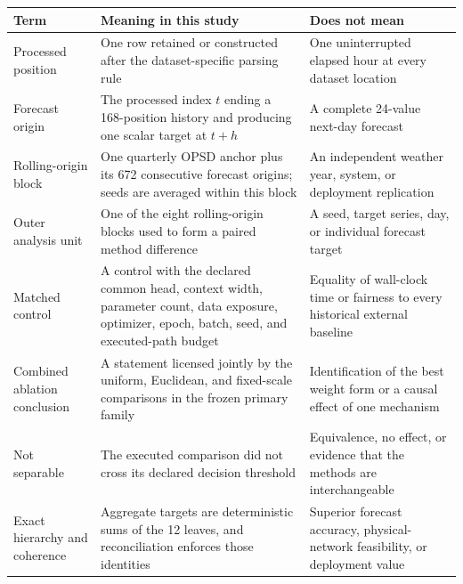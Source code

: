 \documentclass[electronics,article,submit,moreauthors]{Definitions/mdpi}
\begin{document}
\begin{longtable}[]{@{}
  >{\raggedright\arraybackslash}p{}
  >{\raggedright\arraybackslash}p{}
  >{\raggedright\arraybackslash}p{}@{}}
\toprule\noalign{}
\begin{minipage}[b]{\linewidth}\raggedright
Term
\end{minipage} & \begin{minipage}[b]{\linewidth}\raggedright
Meaning in this study
\end{minipage} & \begin{minipage}[b]{\linewidth}\raggedright
Does not mean
\end{minipage} \\
\midrule\noalign{}
\endhead
\bottomrule\noalign{}
\endlastfoot
Processed position & One row retained or constructed after the dataset-specific parsing rule & One uninterrupted elapsed hour at every dataset location \\
Forecast origin & The processed index \(t\) ending a 168-position history and producing one scalar target at \(t+h\) & A complete 24-value next-day forecast \\
Rolling-origin block & One quarterly OPSD anchor plus its 672 consecutive forecast origins; seeds are averaged within this block & An independent weather year, system, or deployment replication \\
Outer analysis unit & One of the eight rolling-origin blocks used to form a paired method difference & A seed, target series, day, or individual forecast target \\
Matched control & A control with the declared common head, context width, parameter count, data exposure, optimizer, epoch, batch, seed, and executed-path budget & Equality of wall-clock time or fairness to every historical external baseline \\
Combined ablation conclusion & A statement licensed jointly by the uniform, Euclidean, and fixed-scale comparisons in the frozen primary family & Identification of the best weight form or a causal effect of one mechanism \\
Not separable & The executed comparison did not cross its declared decision threshold & Equivalence, no effect, or evidence that the methods are interchangeable \\
Exact hierarchy and coherence & Aggregate targets are deterministic sums of the 12 leaves, and reconciliation enforces those identities & Superior forecast accuracy, physical-network feasibility, or deployment value \\
\end{longtable}
\end{document}
